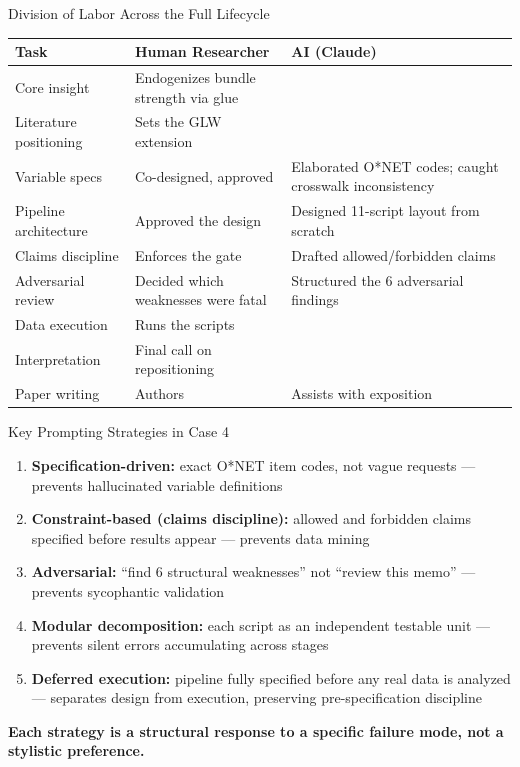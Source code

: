 \documentclass[10pt,english,aspectratio=169]{beamer}
\begin{document}
\begin{frame}{Division of Labor Across the Full Lifecycle}
\small
\begin{tabular}{p{3.4cm}p{3.2cm}p{5.0cm}}
\toprule
Task & Human Researcher & AI (Claude) \\
\midrule
Core insight & Endogenizes bundle strength via glue & \\
Literature positioning & Sets the GLW extension & \\
Variable specs & Co-designed, approved & Elaborated O*NET codes; caught crosswalk inconsistency \\
Pipeline architecture & Approved the design & Designed 11-script layout from scratch \\
Claims discipline & Enforces the gate & Drafted allowed/forbidden claims \\
Adversarial review & Decided which weaknesses were fatal & Structured the 6 adversarial findings \\
Data execution & Runs the scripts & \\
Interpretation & Final call on repositioning & \\
Paper writing & Authors & Assists with exposition \\
\bottomrule
\end{tabular}
\end{frame}

\begin{frame}{Key Prompting Strategies in Case 4}
\begin{enumerate}
  \item \textbf{Specification-driven:} exact O*NET item codes, not vague requests --- prevents hallucinated variable definitions
  \item \textbf{Constraint-based (claims discipline):} allowed and forbidden claims specified before results appear --- prevents data mining
  \item \textbf{Adversarial:} ``find 6 structural weaknesses'' not ``review this memo'' --- prevents sycophantic validation
  \item \textbf{Modular decomposition:} each script as an independent testable unit --- prevents silent errors accumulating across stages
  \item \textbf{Deferred execution:} pipeline fully specified before any real data is analyzed --- separates design from execution, preserving pre-specification discipline
\end{enumerate}
\vspace{0.3cm}
\textbf{Each strategy is a structural response to a specific failure mode, not a stylistic preference.}
\end{frame}
\end{document}

